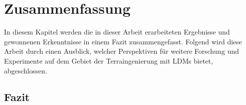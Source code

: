 \chapter{Zusammenfassung}

In diesem Kapitel werden die in dieser Arbeit erarbeiteten Ergebnisse und gewonnenen Erkenntnisse in einem Fazit zusammengefasst. Folgend wird diese Arbeit durch einen Ausblick, welcher Perspektiven für weitere Forschung und Experimente auf dem Gebiet der Terraingenierung mit \ac{LDM}s bietet, abgeschlossen.

\section{Fazit}

